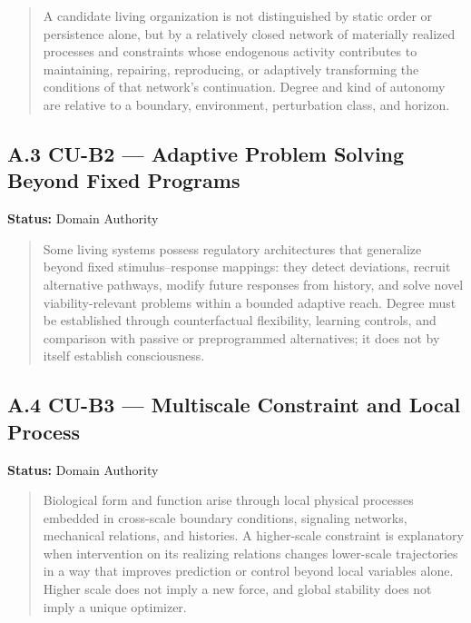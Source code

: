 \documentclass[
  11pt,
]{article}
\begin{document}
\begin{quote}
A candidate living organization is not distinguished by static order or
persistence alone, but by a relatively closed network of materially
realized processes and constraints whose endogenous activity contributes
to maintaining, repairing, reproducing, or adaptively transforming the
conditions of that network's continuation. Degree and kind of autonomy
are relative to a boundary, environment, perturbation class, and
horizon.
\end{quote}

\subsection{A.3 CU-B2 --- Adaptive Problem Solving Beyond Fixed
Programs}\label{a.3-cu-b2-adaptive-problem-solving-beyond-fixed-programs}

\textbf{Status:} Domain Authority

\begin{quote}
Some living systems possess regulatory architectures that generalize
beyond fixed stimulus--response mappings: they detect deviations,
recruit alternative pathways, modify future responses from history, and
solve novel viability-relevant problems within a bounded adaptive reach.
Degree must be established through counterfactual flexibility, learning
controls, and comparison with passive or preprogrammed alternatives; it
does not by itself establish consciousness.
\end{quote}

\subsection{A.4 CU-B3 --- Multiscale Constraint and Local
Process}\label{a.4-cu-b3-multiscale-constraint-and-local-process}

\textbf{Status:} Domain Authority

\begin{quote}
Biological form and function arise through local physical processes
embedded in cross-scale boundary conditions, signaling networks,
mechanical relations, and histories. A higher-scale constraint is
explanatory when intervention on its realizing relations changes
lower-scale trajectories in a way that improves prediction or control
beyond local variables alone. Higher scale does not imply a new force,
and global stability does not imply a unique optimizer.
\end{quote}
\end{document}
